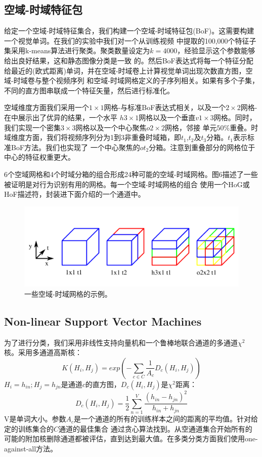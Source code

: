 \documentclass[10pt,twocolumn,letterpaper]{article}
\begin{document}
\subsection{空域-时域特征包}
给定一个空域-时域特征集合，我们构建一个空域-时域特征包(BoF)。这需要构建一个视觉单词。在我们的实验中我们对一个从训练视频
中提取的100,000个特征子集采用k-means算法进行聚类。聚类数量设定为$k=4000$，经验显示这个参数能够给出良好结果，这和静态图像分类是一致
的。然后BoF表达式将每一个特征分配给最近的(欧式距离)单词，并在空域-时域卷上计算视觉单词出现次数直方图，空域-时域卷与整个视频序列
和空域-时域网格定义的子序列相关。如果有多个子集，不同的直方图串联成一个特征矢量，然后进行标准化。

空域维度方面我们采用一个$1\times1$网格-与标准BoF表达式相关，以及一个$2\times2$网格-在\cite{9}中展示出了优异的结果，一个水平
$h3\times1$网格\cite{12}以及一个垂直$v1\times3$网格。同时，我们实现一个密集$3\times3$网格以及一个中心聚焦$o2\times2$网格，邻接
单元$50\%$重叠。时域维度方面，我们将视频序列分为1到3非重叠时域箱，即$t_1$,$t_2$及$t_3$分箱。$t_1$表示标准BoF方法。我们也实现了
一个中心聚焦的$ot_2$分箱。注意到重叠部分的网格位于中心的特征权重更大。

6个空域网格和4个时域分箱的组合形成24种可能的空域-时域网格。图6描述了一些被证明是对行为识别有用的网格。每一个空域-时域网格的组合
使用一个HoG或HoF描述符，封装进下面介绍的一个通道中。

\begin{figure}[h]
\begin{center}
   \includegraphics[width=1.0\linewidth]{fig6.png}
\end{center}
   \caption{
		   一些空域-时域网格的示例。
   }
\end{figure}

\subsection{Non-linear Support Vector Machines}
为了进行分类，我们采用非线性支持向量机和一个鲁棒地联合通道的多通道$\chi^2$核\cite{20}。采用多通道高斯核：
\[K(H_i,H_j)=exp(-\sum_{c\in{C}}\frac{1}{A_c}D_c(H_i,H_j))\]
$H_i={h_{in}};H_j={h_{jn}}$是通道$c$的直方图，$D_c(H_i,H_j)$是$\chi^2$距离：
\[D_c(H_i,H_j)=\frac{1}{2}\sum^V_{n=1}\frac{(h_{in}-h_{jn})^2}{h_{in}+h_{jn}}\]
V是单词大小。参数$A_c$是一个通道的所有的训练样本之间的距离的平均值\cite{20}。针对给定的训练集合的$C$通道的最佳集合
通过贪心算法找到。从空通道集合开始所有的可能的附加核删除通道都被评估，直到达到最大值。在多类分类方面我们使用one-against-all方法。
\end{document}
